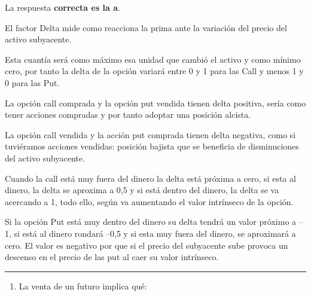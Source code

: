 \documentclass[
  letterpaper,
  DIV=11,
  numbers=noendperiod]{scrreprt}
\providecommand{\tightlist}{%
  \setlength{\itemsep}{0pt}\setlength{\parskip}{0pt}}\usepackage{longtable,booktabs,array}
\begin{document}
\begin{tcolorbox}[enhanced jigsaw, left=2mm, opacityback=0, colback=white, breakable, arc=.35mm, bottomrule=.15mm, rightrule=.15mm, toprule=.15mm, leftrule=.75mm, colframe=quarto-callout-tip-color-frame]
\begin{minipage}[t]{5.5mm}
\textcolor{quarto-callout-tip-color}{\faLightbulb}
\end{minipage}%
\begin{minipage}[t]{\textwidth - 5.5mm}

La respuesta \textbf{correcta es la a}.

El factor Delta mide como reacciona la prima ante la variación del
precio del activo subyacente.

Esta cuantía será como máximo esa unidad que cambió el activo y como
mínimo cero, por tanto la delta de la opción variará entre 0 y 1 para
las Call y menos 1 y 0 para las Put.

La opción call comprada y la opción put vendida tienen delta positiva,
sería como tener acciones compradas y por tanto adoptar una posición
alcista.

La opción call vendida y la acción put comprada tienen delta negativa,
como si tuviéramos acciones vendidas: posición bajista que se beneficia
de disminuciones del activo subyacente.

Cuando la call está muy fuera del dinero la delta está próxima a cero,
si esta al dinero, la delta se aproxima a 0,5 y si está dentro del
dinero, la delta se va acercando a 1, todo ello, según va aumentando el
valor intrínseco de la opción.

Si la opción Put está muy dentro del dinero su delta tendrá un valor
próximo a --1, si está al dinero rondará --0,5 y si esta muy fuera del
dinero, se aproximará a cero. El valor es negativo por que si el precio
del subyacente sube provoca un descenso en el precio de las put al caer
su valor intrínseco.

\end{minipage}%
\end{tcolorbox}

\begin{center}\rule{0.5\linewidth}{0.5pt}\end{center}

\begin{enumerate}
\def\labelenumi{\arabic{enumi}.}
\setcounter{enumi}{24}
\tightlist
\item
  La venta de un futuro implica qué:
\end{enumerate}
\end{document}
